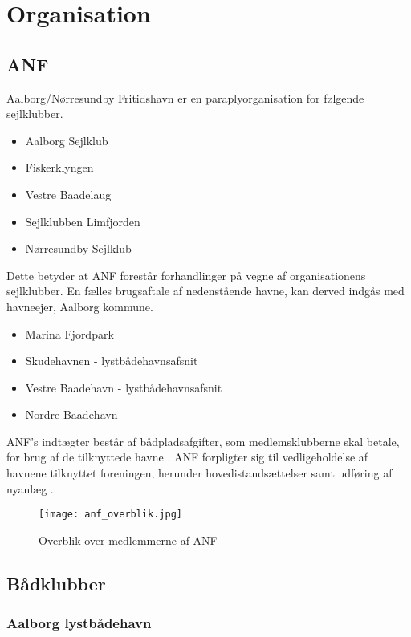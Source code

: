 \section{Organisation}

\subsection{ANF}

Aalborg/Nørresundby Fritidshavn er en paraplyorganisation for følgende sejlklubber. \cite{anf_havnereglement}
\begin{itemize}
	\item Aalborg Sejlklub
	\item Fiskerklyngen
	\item Vestre Baadelaug
	\item Sejlklubben Limfjorden
	\item Nørresundby Sejlklub
\end{itemize}
 
 Dette betyder at ANF forestår forhandlinger på vegne af organisationens sejlklubber. En fælles brugsaftale af nedenstående havne, kan derved indgås med havneejer, Aalborg kommune.

 \begin{itemize}
 	\item Marina Fjordpark
 	\item Skudehavnen - lystbådehavnsafsnit
 	\item Vestre Baadehavn - lystbådehavnsafsnit
 	\item Nordre Baadehavn
 \end{itemize}

 ANF's indtægter består af bådpladsafgifter, som medlemsklubberne skal betale, for brug af de tilknyttede havne \cite{anf_budget_2013}. ANF forpligter sig til vedligeholdelse af havnene tilknyttet foreningen, herunder hovedistandsættelser samt udføring af nyanlæg \cite{anf_brugsaftale_2012}.

 \begin{figure}
 	\begin{center}
 		\texttt{[image: anf\_overblik.jpg]}
 	\end{center}
 	\caption{Overblik over medlemmerne af ANF}
 	\label{fig:anf_overblik}
 \end{figure}

\subsection{Bådklubber}

\subsubsection{Aalborg lystbådehavn}
